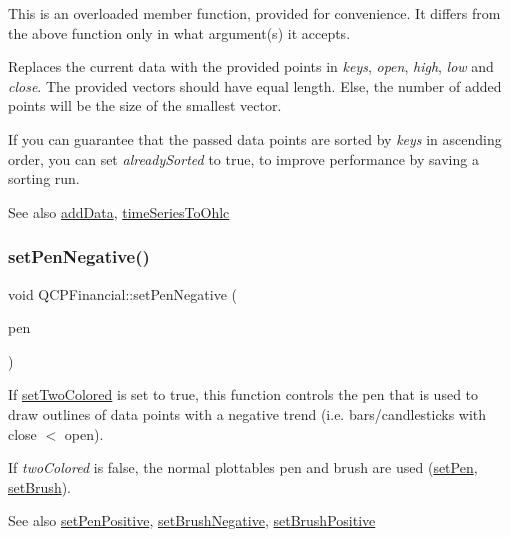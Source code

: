 This is an overloaded member function, provided for convenience. It differs from the above function only in what argument(s) it accepts.

Replaces the current data with the provided points in {\itshape keys}, {\itshape open}, {\itshape high}, {\itshape low} and {\itshape close}. The provided vectors should have equal length. Else, the number of added points will be the size of the smallest vector.

If you can guarantee that the passed data points are sorted by {\itshape keys} in ascending order, you can set {\itshape already\+Sorted} to true, to improve performance by saving a sorting run.

\begin{DoxySeeAlso}{See also}
\mbox{\hyperlink{class_q_c_p_financial_a372ac031e44a7a6c912d203556af96f7}{add\+Data}}, \mbox{\hyperlink{class_q_c_p_financial_a9a058c035040d3939b8884f4aaccb1a7}{time\+Series\+To\+Ohlc}} 
\end{DoxySeeAlso}
\mbox{\label{class_q_c_p_financial_afe5c07e94ccea01a75b3a2476993c346}} 
\subsubsection{\texorpdfstring{set\+Pen\+Negative()}{setPenNegative()}}
{\footnotesize\ttfamily void Q\+C\+P\+Financial\+::set\+Pen\+Negative (\begin{DoxyParamCaption}\item[{const Q\+Pen \&}]{pen }\end{DoxyParamCaption})}

If \mbox{\hyperlink{class_q_c_p_financial_a138e44aac160a17a9676652e240c5f08}{set\+Two\+Colored}} is set to true, this function controls the pen that is used to draw outlines of data points with a negative trend (i.\+e. bars/candlesticks with close $<$ open).

If {\itshape two\+Colored} is false, the normal plottable\textquotesingle{}s pen and brush are used (\mbox{\hyperlink{class_q_c_p_abstract_plottable_ab74b09ae4c0e7e13142fe4b5bf46cac7}{set\+Pen}}, \mbox{\hyperlink{class_q_c_p_abstract_plottable_a7a4b92144dca6453a1f0f210e27edc74}{set\+Brush}}).

\begin{DoxySeeAlso}{See also}
\mbox{\hyperlink{class_q_c_p_financial_ac58aa3adc7a35aab0088764b840683e5}{set\+Pen\+Positive}}, \mbox{\hyperlink{class_q_c_p_financial_a8bbdd87629f9144b3ef51af660c0961a}{set\+Brush\+Negative}}, \mbox{\hyperlink{class_q_c_p_financial_a5ebff2b1764efd07cc44942e67821829}{set\+Brush\+Positive}} 
\end{DoxySeeAlso}
\mbox{\label{class_q_c_p_financial_ac58aa3adc7a35aab0088764b840683e5}} 
